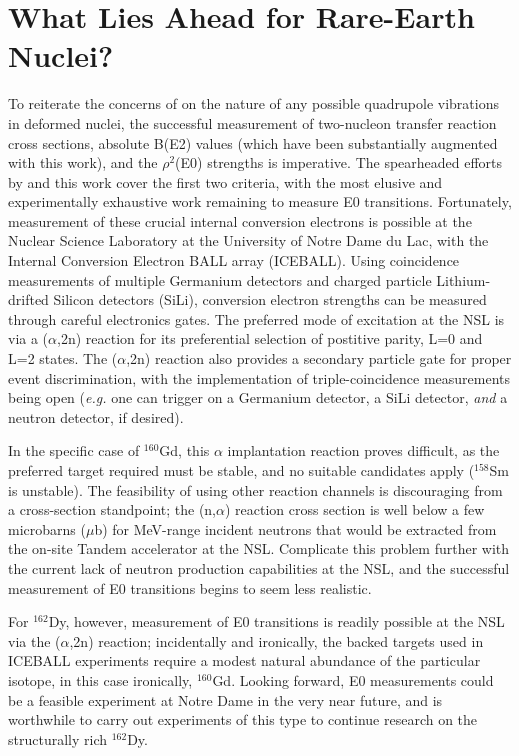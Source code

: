 \section{What Lies Ahead for Rare-Earth Nuclei?}
To reiterate the concerns of \cite{RevModPhys.83.1467} on the nature of any possible quadrupole vibrations in deformed nuclei, the successful measurement of two-nucleon transfer reaction cross sections, absolute B(E2) values (which have been substantially augmented with this work), and the $\rho^2$(E0) strengths is imperative. The spearheaded efforts by \cite{Meyer_pt0_2006} and this work cover the first two criteria, with the most elusive and experimentally exhaustive work remaining to measure E0 transitions. Fortunately, measurement of these crucial internal conversion electrons is possible at the Nuclear Science Laboratory at the University of Notre Dame du Lac, with the Internal Conversion Electron BALL array (ICEBALL). Using coincidence measurements of multiple Germanium detectors and charged particle Lithium-drifted Silicon detectors (SiLi), conversion electron strengths can be measured through careful electronics gates. The preferred mode of excitation at the NSL is via a ($\alpha$,2n) reaction for its preferential selection of postitive parity, L=0 and L=2 states. The ($\alpha$,2n) reaction also provides a secondary particle gate for proper event discrimination, with the implementation of triple-coincidence measurements being open (\textit{e.g.} one can trigger on a Germanium detector, a SiLi detector, \textit{and} a neutron detector, if desired).

In the specific case of $^{160}$Gd, this $\alpha$ implantation reaction proves difficult, as the preferred target required must be stable, and no suitable candidates apply ($^{158}$Sm is unstable). The feasibility of using other reaction channels is discouraging from a cross-section standpoint; the (n,$\alpha$) reaction cross section is well below a few microbarns ($\mu$b) for MeV-range incident neutrons that would be extracted from the on-site Tandem accelerator at the NSL. Complicate this problem further with the current lack of neutron production capabilities at the NSL, and the successful measurement of E0 transitions begins to seem less realistic.

For $^{162}$Dy, however, measurement of E0 transitions is readily possible at the NSL via the ($\alpha$,2n) reaction; incidentally and ironically, the backed targets used in ICEBALL experiments require a modest natural abundance of the particular isotope, in this case ironically, $^{160}$Gd. Looking forward, E0 measurements could be a feasible experiment at Notre Dame in the very near future, and is worthwhile to carry out experiments of this type to continue research on the structurally rich $^{162}$Dy.

